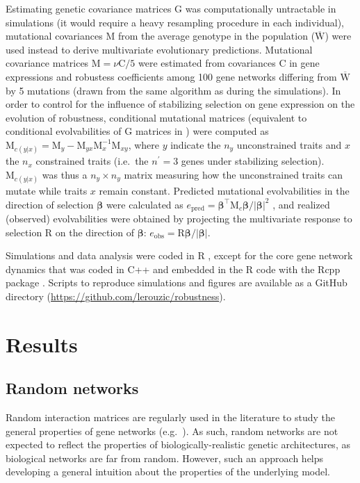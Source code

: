\documentclass[10pt,a4paper]{article}
\newcommand{\W}{\bm{\mathrm W}}
\newcommand{\M}{\bm{\mathrm M}}
\begin{document}
Estimating genetic covariance matrices $\bm{\mathrm G}$ was computationally untractable in simulations (it would require a heavy resampling procedure in each individual), mutational covariances $\M$ from the average genotype in the population ($\overline{\W}$) were used instead to derive multivariate evolutionary predictions. Mutational covariance matrices $\M = \nu \bm{\mathrm C}/5$ were estimated from covariances $\bm{\mathrm C}$ in gene expressions and robustess coefficients among 100 gene networks differing from $\overline{\W}$ by 5 mutations (drawn from the same algorithm as during the simulations). In order to control for the influence of stabilizing selection on gene expression on the evolution of robustness, conditional mutational matrices (equivalent to conditional evolvabilities of $ \bm{\mathrm G}$ matrices in \cite{HH08}) were computed as $\M_{c(y|x)} =\M_y - \M_{yx} \M_x^{-1} \M_{xy}$, where $y$ indicate the $n_y$ unconstrained traits and $x$ the $n_x$ constrained traits (i.e.\ the $n^\prime = 3$ genes under stabilizing selection). $\M_{c(y|x)}$ was thus a $n_y \times n_y$ matrix measuring how the unconstrained traits can mutate while traits $x$ remain constant. Predicted mutational evolvabilities in the direction of selection $\bm \beta$ were calculated as $e_\mathrm{pred} = \bm\beta^\top \M_c \bm\beta / |\bm\beta|^2$ \citep{HH08}, and realized (observed) evolvabilities were obtained by projecting the multivariate response to selection $\bm{\mathrm R}$ on the direction of $\bm\beta$: $e_\mathrm{obs} = \bm{\mathrm R} \bm\beta / |\bm\beta|$. 

Simulations and data analysis were coded in R \citep{R20}, except for the core gene network dynamics that was coded in C++ and embedded in the R code with the Rcpp package \citep{EF11}. Scripts to reproduce simulations and figures are available as a GitHub directory (\url{https://github.com/lerouzic/robustness}). 

\section{Results}

\subsection{Random networks}

Random interaction matrices are regularly used in the literature to study the general properties of gene networks (e.g.\ \cite{CTH11,PBF12}). As such, random networks are not expected to reflect the properties of biologically-realistic genetic architectures, as biological networks are far from random. However, such an approach helps developing a general intuition about the properties of the underlying model. 
\end{document}
